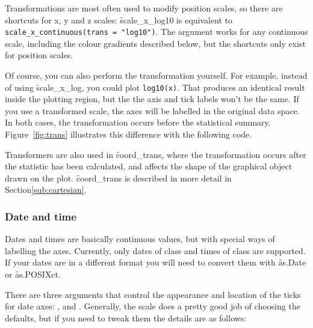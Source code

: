 Transformations are most often used to modify position scales, so there are shortcuts for x, y and z scales: \f{scale_x_log10} is equivalent to \verb|scale_x_continuous(trans = "log10")|.  The  argument works for any continuous scale, including the colour gradients described below, but the shortcuts only exist for position scales.   

Of course, you can also perform the transformation yourself. For example, instead of using \f{scale_x_log}, you could plot {\tt log10(x)}. That produces an identical result inside the plotting region, but the the axis and tick labels won't be the same. If you use a transformed scale, the axes will be labelled in the original data space. In both cases, the transformation occurs before the statistical summary. Figure~\ref{fig:trans} illustrates this difference with the following code. 

% 


Transformers are also used in \f{coord_trans}, where the transformation occurs after the statistic has been calculated, and affects the shape of the graphical object drawn on the plot. \f{coord_trans} is described in more detail in Section\ref{sub:cartesian}.

\subsubsection{Date and time}
\label{sub:scale-date}

Dates and times are basically continuous values, but with special ways of labelling the axes. Currently, only dates of class  and times of class  are supported. If your dates are in a different format you will need to convert them with \f{as.Date} or \f{as.POSIXct}.     

There are three arguments that control the appearance and location of the ticks for date axes: ,  and . Generally, the scale does a pretty good job of choosing the defaults, but if you need to tweak them the details are as follows:

